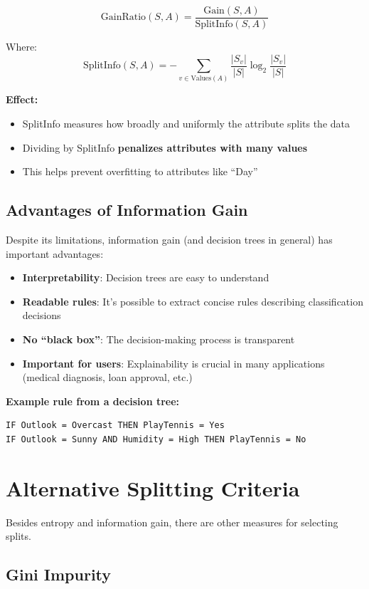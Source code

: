 \documentclass[11pt,a4paper]{article}
\theoremstyle{definition}
\theoremstyle{plain}
\theoremstyle{remark}
\begin{document}
\[
\text{GainRatio}(S, A) = \frac{\text{Gain}(S, A)}{\text{SplitInfo}(S, A)}
\]

Where:
\[
\text{SplitInfo}(S, A) = -\sum_{v \in \text{Values}(A)} \frac{|S_v|}{|S|} \log_2 \frac{|S_v|}{|S|}
\]

\textbf{Effect:}
\begin{itemize}
    \item SplitInfo measures how broadly and uniformly the attribute splits the data
    \item Dividing by SplitInfo \textbf{penalizes attributes with many values}
    \item This helps prevent overfitting to attributes like ``Day''
\end{itemize}

\subsection{Advantages of Information Gain}

Despite its limitations, information gain (and decision trees in general) has important advantages:

\begin{itemize}
    \item \textbf{Interpretability}: Decision trees are easy to understand
    \item \textbf{Readable rules}: It's possible to extract concise rules describing classification decisions
    \item \textbf{No ``black box''}: The decision-making process is transparent
    \item \textbf{Important for users}: Explainability is crucial in many applications (medical diagnosis, loan approval, etc.)
\end{itemize}

\textbf{Example rule from a decision tree:}
\begin{verbatim}
IF Outlook = Overcast THEN PlayTennis = Yes
IF Outlook = Sunny AND Humidity = High THEN PlayTennis = No
\end{verbatim}

\section{Alternative Splitting Criteria}

Besides entropy and information gain, there are other measures for selecting splits.

\subsection{Gini Impurity}
\end{document}
